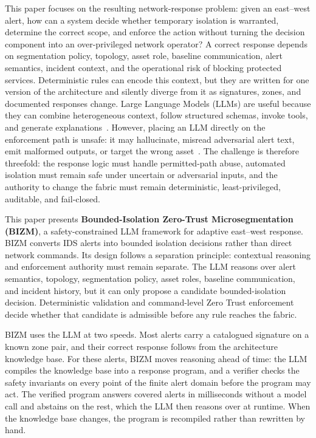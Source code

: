 \documentclass[final,5p]{elsarticle}
\begin{document}
This paper focuses on the resulting network-response problem: given an east--west alert, how can a system decide whether temporary isolation is warranted, determine the correct scope, and enforce the action without turning the decision component into an over-privileged network operator? A correct response depends on segmentation policy, topology, asset role, baseline communication, alert semantics, incident context, and the operational risk of blocking protected services. Deterministic rules can encode this context, but they are written for one version of the architecture and silently diverge from it as signatures, zones, and documented responses change. Large Language Models (LLMs) are useful because they can combine heterogeneous context, follow structured schemas, invoke tools, and generate explanations~\cite{wei2022chain,yao2023react,lewis2020rag,schick2023toolformer,wang2023selfconsistency,madaan2023selfrefine}. However, placing an LLM directly on the enforcement path is unsafe: it may hallucinate, misread adversarial alert text, emit malformed outputs, or target the wrong asset~\cite{liu2023trustworthyllm,yue2023raghallucination}. The challenge is therefore threefold: the response logic must handle permitted-path abuse, automated isolation must remain safe under uncertain or adversarial inputs, and the authority to change the fabric must remain deterministic, least-privileged, auditable, and fail-closed.

This paper presents \textbf{Bounded-Isolation Zero-Trust Microsegmentation (BIZM)}, a safety-constrained LLM framework for adaptive east--west response. BIZM converts IDS alerts into bounded isolation decisions rather than direct network commands. Its design follows a separation principle: contextual reasoning and enforcement authority must remain separate. The LLM reasons over alert semantics, topology, segmentation policy, asset roles, baseline communication, and incident history, but it can only propose a candidate bounded-isolation decision. Deterministic validation and command-level Zero Trust enforcement decide whether that candidate is admissible before any rule reaches the fabric.

BIZM uses the LLM at two speeds. Most alerts carry a catalogued signature on a known zone pair, and their correct response follows from the architecture knowledge base. For these alerts, BIZM moves reasoning ahead of time: the LLM compiles the knowledge base into a response program, and a verifier checks the safety invariants on every point of the finite alert domain before the program may act. The verified program answers covered alerts in milliseconds without a model call and abstains on the rest, which the LLM then reasons over at runtime. When the knowledge base changes, the program is recompiled rather than rewritten by hand.
\end{document}
